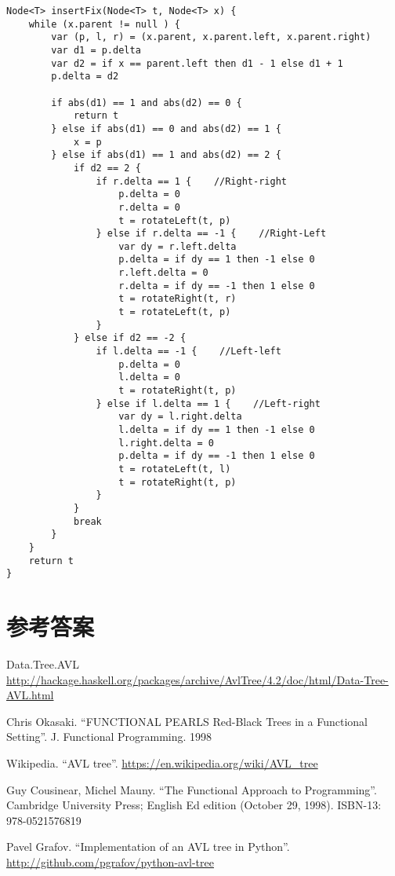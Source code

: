 \documentclass[b5paper]{ctexart}
\begin{document}
\begin{lstlisting}[language = Bourbaki]
Node<T> insertFix(Node<T> t, Node<T> x) {
    while (x.parent != null ) {
        var (p, l, r) = (x.parent, x.parent.left, x.parent.right)
        var d1 = p.delta
        var d2 = if x == parent.left then d1 - 1 else d1 + 1
        p.delta = d2

        if abs(d1) == 1 and abs(d2) == 0 {
            return t
        } else if abs(d1) == 0 and abs(d2) == 1 {
            x = p
        } else if abs(d1) == 1 and abs(d2) == 2 {
            if d2 == 2 {
                if r.delta == 1 {    //Right-right
                    p.delta = 0
                    r.delta = 0
                    t = rotateLeft(t, p)
                } else if r.delta == -1 {    //Right-Left
                    var dy = r.left.delta
                    p.delta = if dy == 1 then -1 else 0
                    r.left.delta = 0
                    r.delta = if dy == -1 then 1 else 0
                    t = rotateRight(t, r)
                    t = rotateLeft(t, p)
                }
            } else if d2 == -2 {
                if l.delta == -1 {    //Left-left
                    p.delta = 0
                    l.delta = 0
                    t = rotateRight(t, p)
                } else if l.delta == 1 {    //Left-right
                    var dy = l.right.delta
                    l.delta = if dy == 1 then -1 else 0
                    l.right.delta = 0
                    p.delta = if dy == -1 then 1 else 0
                    t = rotateLeft(t, l)
                    t = rotateRight(t, p)
                }
            }
            break
        }
    }
    return t
}
\end{lstlisting}

\ifx\wholebook\relax \else
\section{参考答案}
\shipoutAnswer

\begin{thebibliography}{99}

Data.Tree.AVL \url{http://hackage.haskell.org/packages/archive/AvlTree/4.2/doc/html/Data-Tree-AVL.html}

Chris Okasaki. ``FUNCTIONAL PEARLS Red-Black Trees in a Functional Setting''. J. Functional Programming. 1998

Wikipedia. ``AVL tree''. \url{https://en.wikipedia.org/wiki/AVL_tree}

Guy Cousinear, Michel Mauny. ``The Functional Approach to Programming''. Cambridge University Press; English Ed edition (October 29, 1998). ISBN-13: 978-0521576819

Pavel Grafov. ``Implementation of an AVL tree in Python''. \url{http://github.com/pgrafov/python-avl-tree}
\end{thebibliography}
\end{document}
